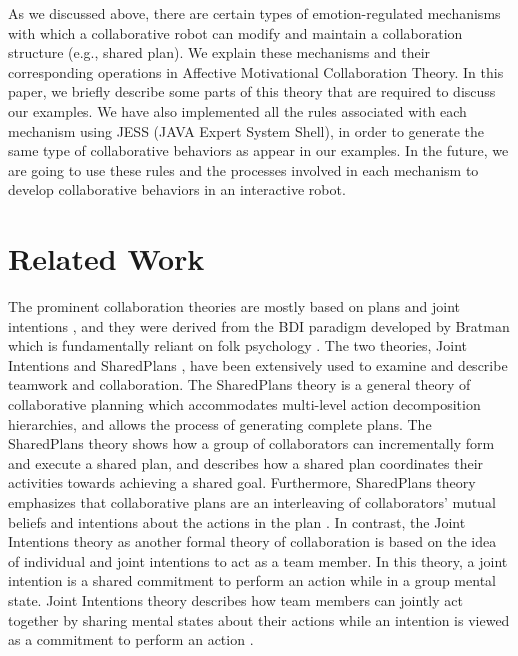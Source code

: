 As we discussed above, there are certain types of emotion-regulated mechanisms
with which a collaborative robot can modify and maintain a collaboration
structure (e.g., shared plan). We explain these mechanisms and their
corresponding operations in Affective Motivational Collaboration Theory. In
this paper, we briefly describe some parts of this theory that are required to
discuss our examples. We have also implemented all the rules associated with
each mechanism using JESS (JAVA Expert System Shell), in order to generate the
same type of collaborative behaviors as appear in our examples. In the future,
we are going to use these rules and the processes involved in each mechanism to
develop collaborative behaviors in an interactive robot.

\section{Related Work}
\label{sec:related-work}

The prominent collaboration theories are mostly based on plans and joint
intentions
\cite{cohen:teamwork,grosz:plans-discourse}, and they were derived from
the BDI paradigm developed by Bratman \cite{bratman:intentions-plans} which is
fundamentally reliant on folk psychology \cite{ravenscroft:folk}. The two
theories, Joint Intentions \cite{cohen:teamwork} and SharedPlans
\cite{grosz:plans-discourse}, have been extensively used to examine and describe
teamwork and collaboration. The SharedPlans theory is a general theory of
collaborative planning which accommodates multi-level action decomposition
hierarchies, and allows the process of generating complete plans. The
SharedPlans theory shows how a group of collaborators can incrementally form and
execute a shared plan, and describes how a shared plan coordinates their
activities towards achieving a shared goal. Furthermore, SharedPlans theory
emphasizes that collaborative plans are an interleaving of collaborators' mutual
beliefs and intentions about the actions in the plan
\cite{grosz:planning-acting,grosz:collaboration,grosz:plans-discourse}. In
contrast, the Joint Intentions theory as another formal theory of collaboration
is based on the idea of individual and joint intentions to act as a team member.
In this theory, a joint intention is a shared commitment to perform an action
while in a group mental state. Joint Intentions theory describes how team
members can jointly act together by sharing mental states about their actions
while an intention is viewed as a commitment to perform an action
\cite{cohen:teamwork}.


